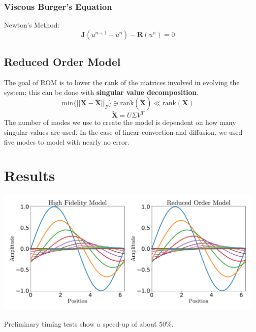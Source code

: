 \documentclass{a0poster}
\begin{document}
\begin{multicols}{3}
\subsubsection{Viscous Burger's Equation}
Newton's Method:
$$\mathrm{\textbf{J}} \left( u^{n+1} - u^n \right) - \mathrm{\textbf{R}} \left( u^n \right)=0$$

\subsection{Reduced Order Model}

The goal of ROM is to lower the rank of the matrices involved in evolving the system; this can be done with \textbf{singular value decomposition}.
$$\mathrm{min} \{ ||\textbf{X} - \tilde{\textbf{X}}||_F \} \ni \mathrm{rank}(\tilde{\textbf{X}}) \ll \mathrm{rank}(\textbf{X})$$
$$\tilde{\textbf{X}} = U \Sigma V^T$$
The number of modes we use to create the model is dependent on how many singular values are used. In the case of linear convection and diffusion, we used five modes to model with nearly no error.

\vspace{-2cm}
\section{Results}

\includegraphics[width=\linewidth]{fig.pdf}

Preliminary timing tests show a speed-up of about 50\%.



\end{multicols}
\end{document}

